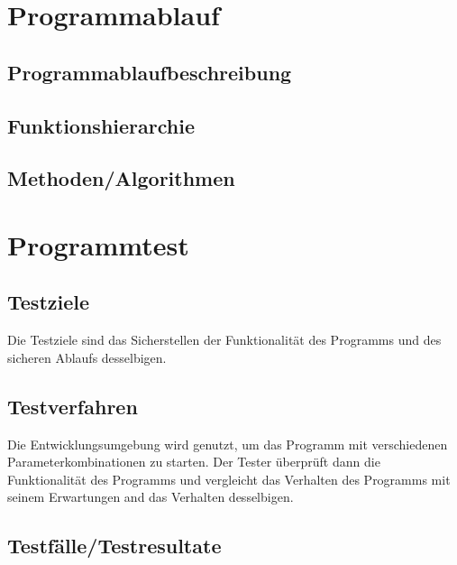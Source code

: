 \documentclass[11pt]{article}
\begin{document}
  \section{Programmablauf}
  
  \subsection{Programmablaufbeschreibung} 
  \subsection{Funktionshierarchie}
  \subsection{Methoden/Algorithmen}
  
   \section{Programmtest}
  \subsection{Testziele}
  Die Testziele sind das Sicherstellen der Funktionalität des Programms und des sicheren Ablaufs desselbigen.
  
  \subsection{Testverfahren}
Die Entwicklungsumgebung wird genutzt, um das Programm mit verschiedenen Parameterkombinationen zu starten. Der Tester überprüft dann die Funktionalität des Programms und vergleicht das Verhalten des Programms mit seinem Erwartungen and das Verhalten desselbigen.
  \subsection{Testfälle/Testresultate}
\end{document}
